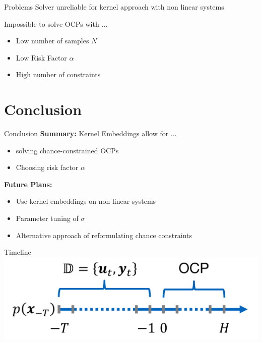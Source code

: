 \documentclass[student, noshadow, itr, english, aspectratio=169]{ITR_LSR_slides}
\begin{document}
\begin{frame}{Problems}
	Solver unreliable for kernel approach with non linear systems

	Impossible to solve OCPs with ...
	\begin{itemize}
	\item Low number of samples $N$
	\item Low Risk Factor $\alpha$
	\item High number of constraints
	\end{itemize}
\end{frame}

\section{Conclusion}

\begin{frame}{Conclusion}
	\textbf{Summary:}
	Kernel Embeddings allow for ...
	\begin{itemize}
		\item solving chance-constrained OCPs
		\item Choosing risk factor $\alpha$
	\end{itemize}
	\vspace{.5cm}
	
	\textbf{Future Plans:}
	\begin{itemize}
		\item Use kernel embeddings on non-linear systems
		\item Parameter tuning of $\sigma$
		\item Alternative approach of reformulating chance constraints
	\end{itemize}
\end{frame}

	\appendix


\begin{frame}{\LSRITRRefTitle}
	\printbibliography
\end{frame}

\begin{frame}{Timeline}
\includegraphics[width= .9\textwidth]{Timeline_pic}
\end{frame}
\end{document}
